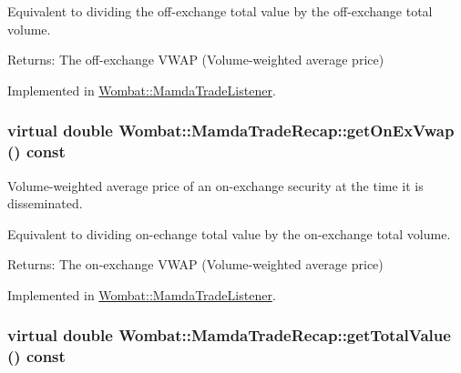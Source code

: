 Equivalent to dividing the off-exchange total value by the off-exchange total volume.

\begin{Desc}
\item[Returns:]The off-exchange VWAP (Volume-weighted average price) \end{Desc}


Implemented in \hyperlink{classWombat_1_1MamdaTradeListener_a7d5a2f66aa6979d4ebd2e8d72621008}{Wombat::Mamda\-Trade\-Listener}.\hypertarget{classWombat_1_1MamdaTradeRecap_dd064f9710f59f8f07309dec3d11411a}{
\subsubsection[getOnExVwap]{\setlength{\rightskip}{0pt plus 5cm}virtual double Wombat::Mamda\-Trade\-Recap::get\-On\-Ex\-Vwap () const}}
\label{classWombat_1_1MamdaTradeRecap_dd064f9710f59f8f07309dec3d11411a}


Volume-weighted average price of an on-exchange security at the time it is disseminated. 

Equivalent to dividing on-echange total value by the on-exchange total volume.

\begin{Desc}
\item[Returns:]The on-exchange VWAP (Volume-weighted average price) \end{Desc}


Implemented in \hyperlink{classWombat_1_1MamdaTradeListener_e0e6940f05e4ba0c6f60c46990d6dbd1}{Wombat::Mamda\-Trade\-Listener}.\hypertarget{classWombat_1_1MamdaTradeRecap_5dd7f2055b4a80d111661c4a1da2abb9}{
\subsubsection[getTotalValue]{\setlength{\rightskip}{0pt plus 5cm}virtual double Wombat::Mamda\-Trade\-Recap::get\-Total\-Value () const}}
\label{classWombat_1_1MamdaTradeRecap_5dd7f2055b4a80d111661c4a1da2abb9}


